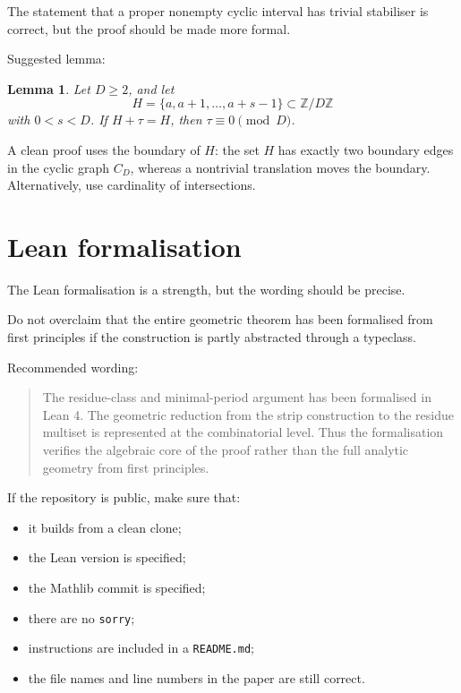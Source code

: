 \documentclass[11pt]{article}
\newtheorem{lemma}{Lemma}
\begin{document}
The statement that a proper nonempty cyclic interval has trivial stabiliser is
correct, but the proof should be made more formal.

Suggested lemma:

\begin{lemma}
Let \(D\ge 2\), and let
\[
H=\{a,a+1,\ldots,a+s-1\}\subset \mathbb Z/D\mathbb Z
\]
with \(0<s<D\).  If \(H+\tau=H\), then \(\tau\equiv0\pmod D\).
\end{lemma}

A clean proof uses the boundary of \(H\): the set \(H\) has exactly two
boundary edges in the cyclic graph \(C_D\), whereas a nontrivial translation
moves the boundary.  Alternatively, use cardinality of intersections.

\section*{Lean formalisation}

The Lean formalisation is a strength, but the wording should be precise.

Do not overclaim that the entire geometric theorem has been formalised from
first principles if the construction is partly abstracted through a typeclass.

Recommended wording:

\begin{quote}
The residue-class and minimal-period argument has been formalised in Lean 4.
The geometric reduction from the strip construction to the residue multiset is
represented at the combinatorial level.  Thus the formalisation verifies the
algebraic core of the proof rather than the full analytic geometry from first
principles.
\end{quote}

If the repository is public, make sure that:

\begin{itemize}
    \item it builds from a clean clone;
    \item the Lean version is specified;
    \item the Mathlib commit is specified;
    \item there are no \texttt{sorry};
    \item instructions are included in a \texttt{README.md};
    \item the file names and line numbers in the paper are still correct.
\end{itemize}
\end{document}
